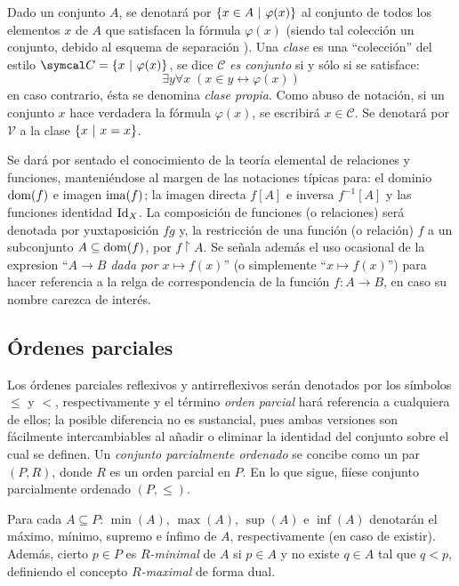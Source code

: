 Dado un conjunto $A$, se denotará por $\{x \in A \text{ $|$ } \varphi (x)\}$ al conjunto de todos los elementos $x$ de $A$ que satisfacen la fórmula $\varphi (x)$ (siendo tal colección un conjunto, debido al esquema de separación \cite[p.~xv]{kunenSet}). Una \textit{clase} es una ``colección'' del estilo $\mathcal{C} = \{x \tq \varphi (x)\}$, se dice $\mathcal{C}$ \textit{es conjunto} si y sólo si se satisface:
$$\exists y \forall x \; ( x \in y \leftrightarrow \varphi(x)  ) $$
en caso contrario, ésta se denomina \textit{clase propia}. Como abuso de notación, si un conjunto $x$ hace verdadera la fórmula $\varphi(x)$, se escribirá $x \in \mathcal{C}$. Se denotará por $\mathcal{V}$ a la clase $\{x \text{ $|$ } x=x\}$.

\index[sym]{$\mapsto$}
Se dará por sentado el conocimiento de la teoría elemental de relaciones y funciones, manteniéndose al margen de las notaciones típicas para: el dominio $\operatorname{dom}(f)$ e imagen $\operatorname{ima}(f)$; la imagen directa $f[A]$ e inversa $f^{-1}[A]$ y las funciones identidad $\operatorname{Id}_X$. La composición de funciones (o relaciones) será denotada por yuxtaposición $fg$ y, la restricción de una función (o relación) $f$ a un subconjunto $A \subseteq \operatorname{dom}(f)$, por $f \upharpoonright A$. Se señala además el uso ocasional de la expresion ``\textit{$A \to B$ dada por $x \mapsto f(x)$}'' (o simplemente ``$x \mapsto f(x)$'') para hacer referencia a la relga de correspondencia de la función $f:A \to B$, en caso su nombre carezca de interés.

\subsection{Órdenes parciales}

Los órdenes parciales reflexivos y antirreflexivos serán denotados por los símbolos $\leq$ y $<$, respectivamente y el término \textit{orden parcial} hará referencia a cualquiera de ellos; la posible diferencia no es sustancial, pues ambas versiones son fácilmente intercambiables al añadir o eliminar la identidad del conjunto sobre el cual se definen. Un \textit{conjunto parcialmente ordenado} se concibe como un par $(P, R)$, donde $R$ es un orden parcial en $P$. En lo que sigue, fiíese conjunto parcialmente ordenado $(P, \leq)$.

Para cada $A \subseteq P$: $\min(A)$, $\max(A)$, $\sup(A)$ e $\inf(A)$ denotarán el máximo, mínimo, supremo e ínfimo de $A$, respectivamente (en caso de existir). Además, cierto $p \in P$ es \textit{$R$-minimal} de $A$ si $p \in A$ y no existe $q \in A$ tal que $q < p$, definiendo el concepto \textit{$R$-maximal} de forma dual.

